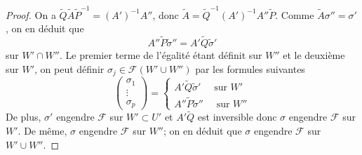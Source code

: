 \documentclass{article}
\theoremstyle{definition}
\theoremstyle{remark}
\begin{document}
\begin{proof}
On a $\tilde{Q}\tilde{A}\tilde{P}^{-1} = (A')^{-1}A''$, donc $\tilde{A} = \tilde{Q}^{-1}(A')^{-1}A''\tilde{P}$. Comme $\tilde{A}\sigma'' = \sigma'$, on en déduit que $$A''\tilde{P}\tilde{\sigma}''=A'\tilde{Q}\tilde{\sigma}'$$ sur $W' \cap W''$. Le premier terme de l'égalité étant définit sur $W''$ et le deuxième sur $W'$, on peut définir $\sigma_j \in \mathcal{F}(W'\cup W'')$ par les formules suivantes
\begin{equation*}
\begin{pmatrix}
   \sigma_1 \\ \vdots \\ \sigma_p
\end{pmatrix} = \left\{
\begin{array}{l}
  A'\tilde{Q}\tilde{\sigma}' \quad\text{ sur } W'\\
  A''\tilde{P}\tilde{\sigma}'' \quad\text{ sur } W''
\end{array}
\right.
\end{equation*}
De plus, $\sigma'$ engendre $\mathcal{F}$ sur $W' \subset U'$ et $A'\tilde{Q}$ est inversible donc $\sigma$ engendre $\mathcal{F}$ sur $W'$. De même, $\sigma$ engendre $\mathcal{F}$ sur $W''$; on en déduit que $\sigma$ engendre $\mathcal{F}$ sur $W'\cup W''$.
\end{proof}
\end{document}
